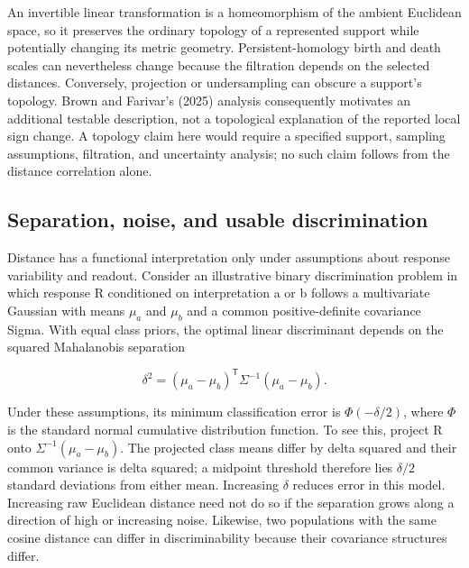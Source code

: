 \documentclass[11pt]{article}
\begin{document}
An invertible linear transformation is a homeomorphism of the ambient
Euclidean space, so it preserves the ordinary topology of a represented
support while potentially changing its metric geometry.
Persistent-homology birth and death scales can nevertheless change
because the filtration depends on the selected distances. Conversely,
projection or undersampling can obscure a support's topology. Brown and
Farivar's (2025) analysis consequently motivates an additional testable
description, not a topological explanation of the reported local sign
change. A topology claim here would require a specified support,
sampling assumptions, filtration, and uncertainty analysis; no such
claim follows from the distance correlation alone.

\hypertarget{separation-noise-and-usable-discrimination}{%
\subsection{Separation, noise, and usable
discrimination}\label{separation-noise-and-usable-discrimination}}

Distance has a functional interpretation only under assumptions about
response variability and readout. Consider an illustrative binary
discrimination problem in which response R conditioned on interpretation
a or b follows a multivariate Gaussian with means \(\mu_a\) and
\(\mu_b\) and a common positive-definite covariance Sigma. With equal
class priors, the optimal linear discriminant depends on the squared
Mahalanobis separation

\begin{equation}
\delta^2=(\mu_a-\mu_b)^{\mathsf T}\Sigma^{-1}(\mu_a-\mu_b).
\end{equation}

Under these assumptions, its minimum classification error is
\(\Phi(-\delta/2)\), where \(\Phi\) is the standard normal cumulative
distribution function. To see this, project R onto
\(\Sigma^{-1}(\mu_a-\mu_b)\). The projected class means differ by delta
squared and their common variance is delta squared; a midpoint threshold
therefore lies \(\delta/2\) standard deviations from either mean.
Increasing \(\delta\) reduces error in this model. Increasing raw
Euclidean distance need not do so if the separation grows along a
direction of high or increasing noise. Likewise, two populations with
the same cosine distance can differ in discriminability because their
covariance structures differ.
\end{document}
